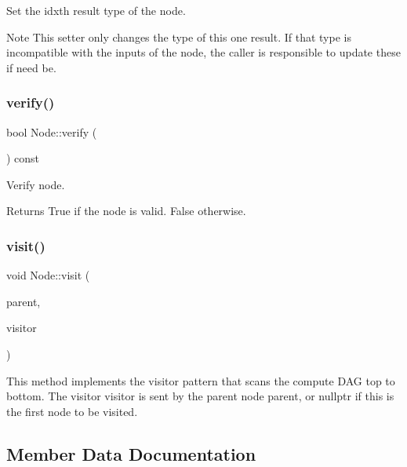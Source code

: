 Set the {\ttfamily idx\textquotesingle{}th} result type of the node. \begin{DoxyNote}{Note}
This setter only changes the type of this one result. If that type is incompatible with the inputs of the node, the caller is responsible to update these if need be. 
\end{DoxyNote}
\mbox{\label{classglow_1_1_node_a68444a674fcec690542184620c62f3f9}} 
\subsubsection{\texorpdfstring{verify()}{verify()}}
{\footnotesize\ttfamily bool Node\+::verify (\begin{DoxyParamCaption}{ }\end{DoxyParamCaption}) const}

Verify node. \begin{DoxyReturn}{Returns}
True if the node is valid. False otherwise. 
\end{DoxyReturn}
\mbox{\label{classglow_1_1_node_a3cf56aeb0f2601d389efd276691ba0cc}} 
\subsubsection{\texorpdfstring{visit()}{visit()}}
{\footnotesize\ttfamily void Node\+::visit (\begin{DoxyParamCaption}\item[{\hyperlink{classglow_1_1_node}{Node} $\ast$}]{parent,  }\item[{\hyperlink{classglow_1_1_node_walker}{Node\+Walker} $\ast$}]{visitor }\end{DoxyParamCaption})}

This method implements the visitor pattern that scans the compute D\+AG top to bottom. The visitor {\ttfamily visitor} is sent by the parent node {\ttfamily parent}, or nullptr if this is the first node to be visited. 

\subsection{Member Data Documentation}
\mbox{\label{classglow_1_1_node_abff87321fccd69d8c1feb8b453c28e13}} 
